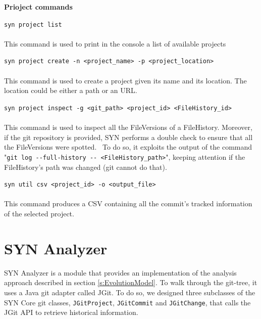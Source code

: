 \bigbreak
\textbf{Prioject commands}
\bigbreak

\lstinline{syn project list}\\
\\
This command is used to print in the console a list of available projects

\bigbreak
\lstinline{syn project create -n <project_name> -p <project_location>}\\
\\
This command is used to create a project given its name and its location. The location could be either a path or an URL. 

\bigbreak
\lstinline{syn project inspect -g <git_path> <project_id> <FileHistory_id>}\\
\\
This command is used to inspect all the FileVersions of a FileHistory. Moreover, if the git repository is provided, SYN performs a double check to ensure that all the FileVersions were spotted. \
To do so, it exploits the output of the command "\lstinline{git log --full-history -- <FileHistory_path>}", keeping attention if the FileHistory's path was changed (git cannot do that).

\bigbreak
\lstinline{syn util csv <project_id> -o <output_file>}\\
\\
This command produces a CSV containing all the commit's tracked information of the selected project. 


\section{SYN Analyzer}
SYN Analyzer is a module that provides an implementation of the analysis approach described in section \ref{s:EvolutionModel}.
To walk through the git-tree, it uses a Java git adapter called JGit. 
To do so, we designed three subclasses of the SYN Core git classes, \texttt{JGitProject}, \texttt{JGitCommit} and \texttt{JGitChange}, that calls the JGit API to retrieve historical information. 
\bigbreak

